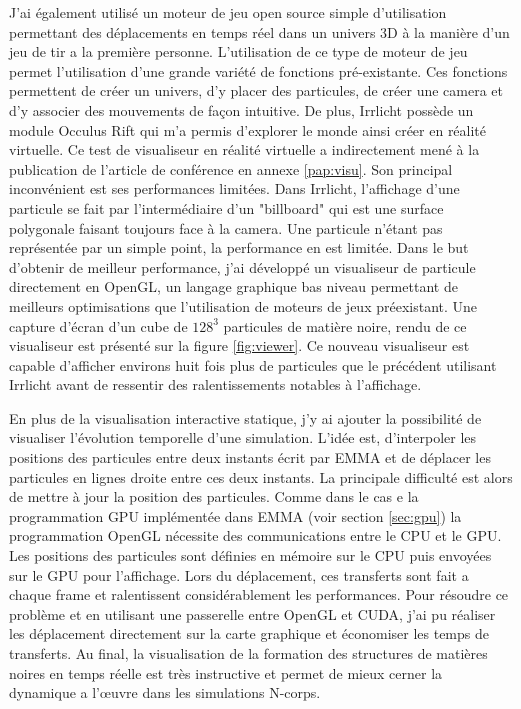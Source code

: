 J'ai également utilisé \cite{Irrlicht} un moteur de jeu open source simple d'utilisation permettant des déplacements en temps réel dans un univers 3D à la manière d'un jeu de tir a la première personne.
L'utilisation de ce type de moteur de jeu permet l'utilisation d'une grande variété de fonctions pré-existante.
Ces fonctions permettent de créer un univers, d'y placer des particules, de créer une camera et d'y associer des mouvements de façon intuitive.
De plus, Irrlicht possède un module Occulus Rift qui m'a permis d'explorer le monde ainsi créer en réalité virtuelle.
Ce test de visualiseur en réalité virtuelle a indirectement mené à la publication de l'article de conférence en annexe \ref{pap:visu}.
Son principal inconvénient est ses performances limitées.
Dans Irrlicht, l'affichage d'une particule se fait par l'intermédiaire d'un "billboard" qui est une surface polygonale faisant toujours face à la camera.
Une particule n'étant pas représentée par un simple point, la performance en est limitée.
Dans le but d'obtenir de meilleur performance, j'ai développé un visualiseur de particule directement en OpenGL, un langage graphique bas niveau permettant de meilleurs optimisations que l'utilisation de moteurs de jeux préexistant.
Une capture d'écran d'un cube de $128^3$ particules de matière noire, rendu de ce visualiseur est présenté sur la figure \ref{fig:viewer}.
Ce nouveau visualiseur est capable d'afficher environs huit fois plus de particules que le précédent utilisant Irrlicht avant de ressentir des ralentissements notables à l'affichage. 


En plus de la visualisation interactive statique, j'y ai ajouter la possibilité de visualiser l’évolution temporelle d'une simulation.
L'idée est, d'interpoler les positions des particules entre deux instants écrit par EMMA et de déplacer les particules en lignes droite entre ces deux instants.
La principale difficulté est alors de mettre à jour la position des particules.
Comme dans le cas e la programmation \ac{GPU} implémentée dans EMMA (voir section \ref{sec:gpu}) la programmation OpenGL nécessite des communications entre le \ac{CPU} et le \ac{GPU}.
Les positions des particules sont définies en mémoire sur le \ac{CPU} puis envoyées sur le \ac{GPU} pour l'affichage.
Lors du déplacement, ces transferts sont fait a chaque frame et ralentissent considérablement les performances.
Pour résoudre ce problème et en utilisant une passerelle entre OpenGL et CUDA, j'ai pu réaliser les déplacement directement sur la carte graphique et économiser les temps de transferts.
Au final, la visualisation de la formation des structures de matières noires en temps réelle est très instructive et permet de mieux cerner la dynamique a l’œuvre dans les simulations N-corps.

